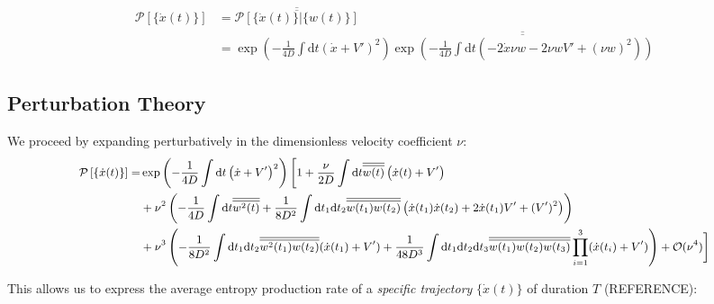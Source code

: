 \documentclass[%
 amsmath,amssymb,
]{revtex4-2}
\newcommand{\Overline}[1]{\overline{\overline{#1}}}
\newcommand{\rmd}[0]{\mathrm{d}}
\begin{document}
\begin{equation}
\begin{split}
\mathcal{P}\left[\{\dot{x}(t)\}\right] &= \Overline{\mathcal{P}\left[\{\dot{x}(t)\}|\{w(t)\}\right] } \\
&= \exp \left(-\frac{1}{4D} \int \rmd t \left(\dot{x}+ V'\right)^2 \right) \Overline{\exp \left(-\frac{1}{4D} \int \rmd t (-2\dot{x}\nu w- 2\nu w V' + (\nu w)^2)\right)}
\end{split}
\end{equation}

\subsection{Perturbation Theory}

We proceed by expanding perturbatively in the dimensionless velocity coefficient $\nu$:
\begin{equation}\small
\begin{split}
     \mathcal{P}\left[\{\dot{x}(t)\}\right] = &\exp \left(-\frac{1}{4D} \int \rmd t \left(\dot{x}+V' \right)^2 \right) \bigg[1+\frac{\nu}{2D}\int \rmd t \Overline{w(t)}\left( \dot{x}(t) + V'\right) \\ &+ \nu^2 \left(-\frac{1}{4D}\int \rmd t \Overline{w^2(t)} + \frac{1}{8D^2}\int \rmd t_1 \rmd t_2 \Overline{w(t_1)w(t_2)}\left(\dot{x}(t_1)\dot{x}(t_2) + 2\dot{x}(t_1)V' + (V')^2\right)\right) \\
     &+ \nu^3 \left( -\frac{1}{8D^2}\int \rmd t_1\rmd t_2 \Overline{w^2(t_1)w(t_2)}(\dot{x}(t_1) + V') + \frac{1}{48D^3}\int \rmd t_1 \rmd t_2 \rmd t_3 \Overline{w(t_1)w(t_2)w(t_3)}\prod_{i=1}^3(\dot{x}(t_i)+V') \right) + \mathcal{O}(\nu^4) \bigg]
\end{split}
\end{equation}

This allows us to express the average entropy production rate of a \textit{specific trajectory} $\{\dot{x}(t)\}$ of duration $T$ (REFERENCE):
\end{document}
